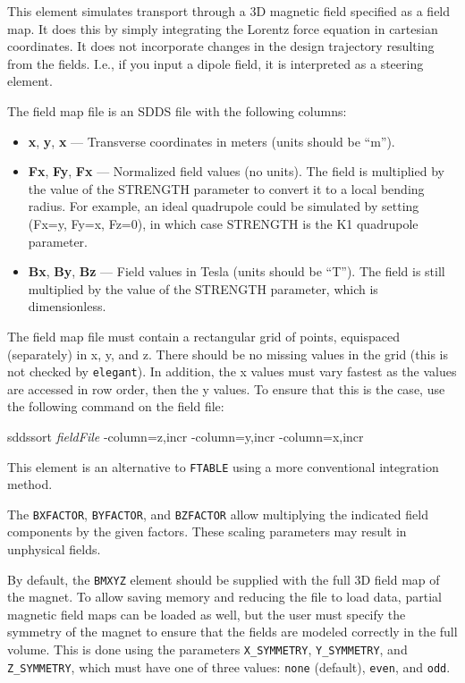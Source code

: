 This element simulates transport through a 3D magnetic field
specified as a field map.  It does this by simply integrating the
Lorentz force equation in cartesian coordinates.  It does not
incorporate changes in the design trajectory resulting from the
fields.  I.e., if you input a dipole field, it is interpreted as a
steering element.

The field map file is an SDDS file with the following columns:
\begin{itemize}
\item {\bf x}, {\bf y}, {\bf x} --- Transverse coordinates in meters (units should be ``m'').
\item {\bf Fx}, {\bf Fy}, {\bf Fx} --- Normalized field values (no units).  The
        field is multiplied by the value of the STRENGTH parameter to convert it to a 
        local bending radius.  For example, an ideal quadrupole could be simulated
        by setting (Fx=y, Fy=x, Fz=0), in which case STRENGTH is the
        K1 quadrupole parameter.
\item {\bf Bx}, {\bf By}, {\bf Bz} --- Field values in Tesla (units should be ``T'').
        The field is still multiplied by the value of the STRENGTH parameter, which
        is dimensionless.
\end{itemize}

The field map file must contain a rectangular grid of points,
equispaced (separately) in x, y, and z.  There should be no missing values
in the grid (this is not checked by {\tt elegant}).  In addition, the
x values must vary fastest as the values are accessed in row order, then the y values.
To ensure that this is the case, use the following command on the field
file:
\begin{flushleft}
sddssort {\em fieldFile} -column=z,incr -column=y,incr -column=x,incr
\end{flushleft}

This element is an alternative to \verb|FTABLE| using a more conventional integration method.

The \verb|BXFACTOR|, \verb|BYFACTOR|, and \verb|BZFACTOR| allow multiplying the indicated field components by the given factors.
These scaling parameters may result in unphysical fields.

By default, the \verb|BMXYZ| element should be supplied with the full 3D field map of the magnet.
To allow saving memory and reducing the file to load data, partial magnetic field maps can be 
loaded as well, but the user must specify the symmetry of the magnet to ensure that the fields are
modeled correctly in the full volume.
This is done using the parameters \verb|X_SYMMETRY|, \verb|Y_SYMMETRY|, and \verb|Z_SYMMETRY|, which
must have one of three values: \verb|none| (default), \verb|even|, and \verb|odd|.  

